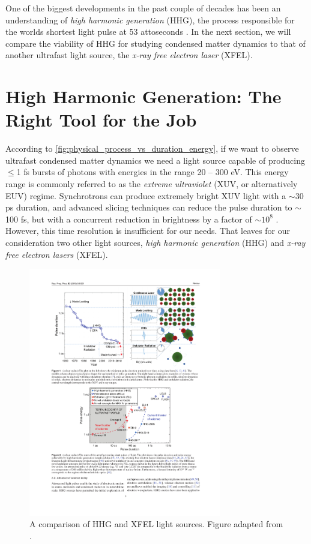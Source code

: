One of the biggest developments in the past couple of decades has been an understanding of \textit{high harmonic generation} (HHG), the process responsible for the worlds shortest light pulse at 53 attoseconds \cite{li53attosecondXrayPulses2017}. In the next section, we will compare the viability of HHG for studying condensed matter dynamics to that of another ultrafast light source, the \textit{x-ray free electron laser} (XFEL).

\section{High Harmonic Generation: The Right Tool for the Job}

According to \cref{fig:physical_process_vs_duration_energy}, if we want to observe ultrafast condensed matter dynamics we need a light source capable of producing $\le$1 fs bursts of photons with energies in the range {20 -- 300 eV}. This energy range is commonly referred to as the \textit{extreme ultraviolet} (XUV, or alternatively EUV) regime. Synchrotrons can produce extremely bright XUV light with a $\sim$30 ps duration, and advanced slicing techniques can reduce the pulse duration to {$\sim$100 fs}, but with a concurrent reduction in brightness by a factor of $\sim 10^{8}$ \cite{schoenleinGenerationFemtosecondPulses2000}. However, this time resolution is insufficient for our needs. That leaves for our consideration two other light sources, \textit{high harmonic generation} (HHG) and \textit{x-ray free electron lasers} (XFEL).

\begin{figure}
	\centering
	\includegraphics[width=0.75\textwidth]{figures/chap1/HHG_vs_XFEL_2.pdf}
	\caption{A comparison of HHG and XFEL light sources. Figure adapted from \cite{makAttosecondSinglecycleUndulator2019}.}
	\label{fig:HHG_vs_XFEL}
\end{figure}

